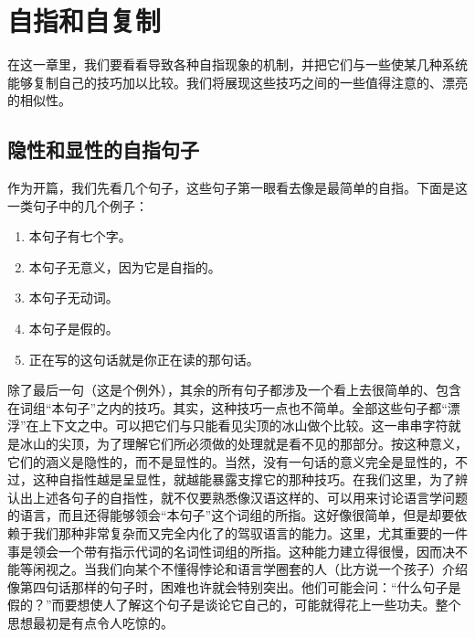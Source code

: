 
\chapter{自指和自复制}

在这一章里，我们要看看导致各种自指现象的机制，并把它们与一些使某几种系统能够复制自己的技巧加以比较。我们将展现这些技巧之间的一些值得注意的、漂亮的相似性。

\section{隐性和显性的自指句子}

作为开篇，我们先看几个句子，这些句子第一眼看去像是最简单的自指。下面是这一类句子中的几个例子：
\begin{enumerate}
\item 本句子有七个字。
\item 本句子无意义，因为它是自指的。
\item 本句子无动词。
\item 本句子是假的。
\item 正在写的这句话就是你正在读的那句话。
\end{enumerate}
除了最后一句（这是个例外），其余的所有句子都涉及一个看上去很简单的、包含在词组“本句子”之内的技巧。其实，这种技巧一点也不简单。全部这些句子都“漂浮”在上下文之中。可以把它们与只能看见尖顶的冰山做个比较。这一串串字符就是冰山的尖顶，为了理解它们所必须做的处理就是看不见的那部分。按这种意义，它们的涵义是隐性的，而不是显性的。当然，没有一句话的意义完全是显性的，不过，这种自指性越是呈显性，就越能暴露支撑它的那种技巧。在我们这里，为了辨认出上述各句子的自指性，就不仅要熟悉像汉语这样的、可以用来讨论语言学问题的语言，而且还得能够领会“本句子”这个词组的所指。这好像很简单，但是却要依赖于我们那种非常复杂而又完全内化了的驾驭语言的能力。这里，尤其重要的一件事是领会一个带有指示代词的名词性词组的所指。这种能力建立得很慢，因而决不能等闲视之。当我们向某个不懂得悖论和语言学圈套的人（比方说一个孩子）介绍像第四句话那样的句子时，困难也许就会特别突出。他们可能会问：“什么句子是假的？”而要想使人了解这个句子是谈论它自己的，可能就得花上一些功夫。整个思想最初是有点令人吃惊的。

\begin{lrbox}{\TEMPBOX}%
\end{lrbox}

